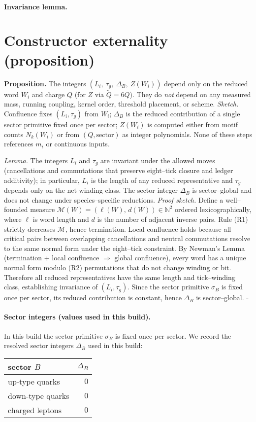 \documentclass[epjc3]{svjour3}
\begin{document}
\paragraph{Invariance lemma.}
\section*{Constructor externality (proposition)}
\textbf{Proposition.} The integers $(L_i,\ \tau_g,\ \Delta_B,\ Z(W_i))$ depend only on the reduced word $W_i$ and charge $Q$ (for $Z$ via $\tilde Q=6Q$). They do \emph{not} depend on any measured mass, running coupling, kernel order, threshold placement, or scheme.
\emph{Sketch.} Confluence fixes $(L_i,\tau_g)$ from $W_i$; $\Delta_B$ is the reduced contribution of a single sector primitive fixed once per sector; $Z(W_i)$ is computed either from motif counts $N_k(W_i)$ or from $(Q,\text{sector})$ as integer polynomials. None of these steps references $m_i$ or continuous inputs.

\emph{Lemma.} The integers $L_i$ and $\tau_g$ are invariant under the allowed moves (cancellations and commutations that preserve eight--tick closure and ledger additivity); in particular, $L_i$ is the length of any reduced representative and $\tau_g$ depends only on the net winding class. The sector integer $\Delta_B$ is sector--global and does not change under species--specific reductions. \emph{Proof sketch.} Define a well--founded measure $\mathcal M(W)=(\ell(W),\,d(W))\in\mathbb N^2$ ordered lexicographically, where $\ell$ is word length and $d$ is the number of adjacent inverse pairs. Rule (R1) strictly decreases $\mathcal M$, hence termination. Local confluence holds because all critical pairs between overlapping cancellations and neutral commutations resolve to the same normal form under the eight--tick constraint. By Newman's Lemma (termination + local confluence $\Rightarrow$ global confluence), every word has a unique normal form modulo (R2) permutations that do not change winding or bit. Therefore all reduced representatives have the same length and tick--winding class, establishing invariance of $(L_i,\tau_g)$. Since the sector primitive $\sigma_B$ is fixed once per sector, its reduced contribution is constant, hence $\Delta_B$ is sector--global. $\square$

\paragraph{Sector integers (values used in this build).}
In this build the sector primitive $\sigma_B$ is fixed once per sector. We record the resolved sector integers $\Delta_B$ used in this build:
\begin{center}
\begin{tabular}{l r}
\toprule
sector $B$ & $\Delta_B$ \\
\midrule
up-type quarks & $0$ \\
down-type quarks & $0$ \\
charged leptons & $0$ \\
\bottomrule
\end{tabular}
\end{center}
\end{document}
